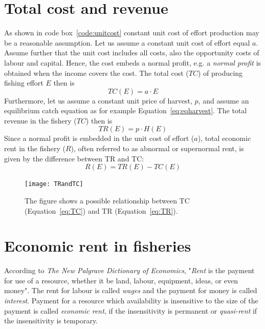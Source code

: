\documentclass[11pt,fleqn]{book} %
\begin{document}
\section{Total cost and revenue}\label{TC and TR}

As shown in code box~\ref{code:unitcost} constant unit cost of effort production may be a reasonable assumption. Let us assume a constant unit cost of effort equal $a$. Assume further that the unit cost includes all costs, also the opportunity costs of labour and capital. Hence, the cost embeds a normal profit, e.g. a \textit{normal profit}  is obtained when the income covers the cost. The total cost ($TC$) of producing fishing effort $E$ then is
\begin{equation} 
\label{eq:TC}
TC(E) = a \cdot E
\end{equation}
Furthermore, let us assume a constant unit price of harvest, $p$, and assume an equilibrium catch equation as for example Equation~\ref{eq:eqharvest}. The total revenue in the fishery ($TC$) then is
\begin{equation} 
\label{eq:TR}
TR(E) = p \cdot H(E)
\end{equation}
Since a normal profit is embedded in the unit cost of effort ($a$), total economic rent in the fishery ($R$), often referred to as abnormal or supernormal rent, is given by the difference between TR and TC:
\begin{equation} 
\label{eq:R}
R(E) = TR(E) - TC(E)
\end{equation}

\begin{figure}[ht]
\centering\texttt{[image: TRandTC]}
\caption{The figure shows a possible relationship between TC (Equation~\ref{eq:TC}) and TR (Equation~\ref{eq:TR}).}
\label{fig:TRandTC}
\end{figure}

\section{Economic rent in fisheries}\label{rent}

According to \textit{The New Palgrave Dictionary of Economics}, "\textit{Rent} is the payment for use of a resource, whether it be land, labour, equipment, ideas, or even money"\cite{Alchian1987}. The rent for labour is called \textit{wages} and the payment for money is called \textit{interest}. Payment for a resource which availability is insensitive to the size of the payment is called \textit{economic rent}, if the insensitivity is permanent or \textit{quasi-rent} if the insensitivity is temporary.
\end{document}
